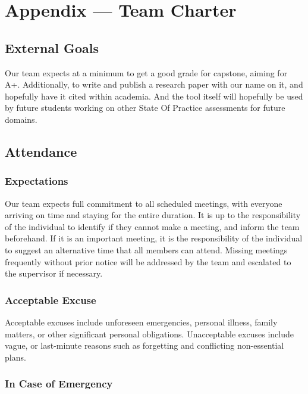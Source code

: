 \documentclass{article}
\begin{document}
\newpage{}

\section*{Appendix --- Team Charter}

\subsection*{External Goals}

Our team expects at a minimum to get a good grade for capstone, aiming for A+. Additionally, to write and publish a research paper with our name on it, and hopefully have it cited within academia.
And the tool itself will hopefully be used by future students working on other State Of Practice assessments for future domains.

\subsection*{Attendance}

\subsubsection*{Expectations}

Our team expects full commitment to all scheduled meetings, with everyone arriving on time and staying for the entire duration. It is up to the responsibility of the individual to identify if they cannot make a meeting, and inform the team beforehand.
If it is an important meeting, it is the responsibility of the individual to suggest an alternative time that all members can attend. Missing meetings frequently without prior notice will be addressed by the team and escalated to the supervisor if necessary.

\subsubsection*{Acceptable Excuse}

Acceptable excuses include unforeseen emergencies, personal illness, family matters, or other significant personal obligations. Unacceptable excuses include vague, or last-minute reasons such as forgetting and conflicting non-essential plans.

\subsubsection*{In Case of Emergency}
\end{document}
